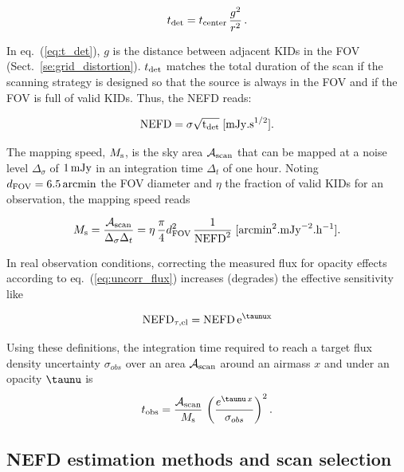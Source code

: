 \begin{equation}
  t_{\rm{det}} = t_{\rm{center}}\, \frac{g^2}{r^2}\,.
\label{eq:t_det}
\end{equation}

In eq.~(\ref{eq:t_det}), $g$ is the distance between adjacent KIDs in the FOV
(Sect.~\ref{se:grid_distortion}). $t_{\rm{det}}$ matches the total duration of
the scan if the scanning strategy is designed so that the source is always in
the FOV and if the FOV is full of valid KIDs. Thus, the NEFD reads:

\begin{equation}
  \rm{NEFD} = \sigma \sqrt{t_{\rm{det}}}\; [\rm{mJy.s}^{1/2}].
\end{equation}

The mapping speed, $M_{\rm{s}}$, is the sky area $\mathcal{A}_{\rm{scan}}$ that
can be mapped at a noise level $\Delta_\sigma$ of $1\,\rm{mJy}$ in an
integration time $\Delta_t$ of one hour. Noting $d_{\rm{FOV}} =
6.5\,\rm{arcmin}$ the FOV diameter and $\eta$ the fraction of valid KIDs for an
observation, the mapping speed reads

\begin{equation}
M_{\rm{s}} = \frac{\mathcal{A}_{\rm{scan}}}{\Delta_\sigma\Delta_t} = 
\eta \, \frac{\pi}{4} d_{\rm{FOV}}^2 \, \frac{1}{\rm{NEFD}^2}\; [\rm{arcmin}^2.\rm{mJy}^{-2}.\rm{h}^{-1}].
\label{eq:mapping_speed}
\end{equation}

In real observation conditions, correcting the measured flux for opacity effects
according to eq.~(\ref{eq:uncorr_flux}) increases (degrades) the effective
sensitivity like

\begin{equation}
\rm{NEFD}_{\tau,el} = \rm{NEFD}\, e^{\taunu x}
\label{eq:nefd_tau_el}
\end{equation}

Using these definitions, the integration time required to reach a target flux
density uncertainty $\sigma_{obs}$ over an area $\mathcal{A}_{\rm{scan}}$ around
an airmass $x$ and under an opacity $\taunu$ is
\begin{equation}
  t_{\rm{obs}} = \frac{\mathcal{A}_{\rm{scan}}}{ M_{\rm{s}}} \, \left(\frac{e^{\taunu\, x}}{\sigma_{obs}}\right)^2.
\end{equation}


\subsection{NEFD estimation methods and scan selection}
\label{se:nefd_method}

